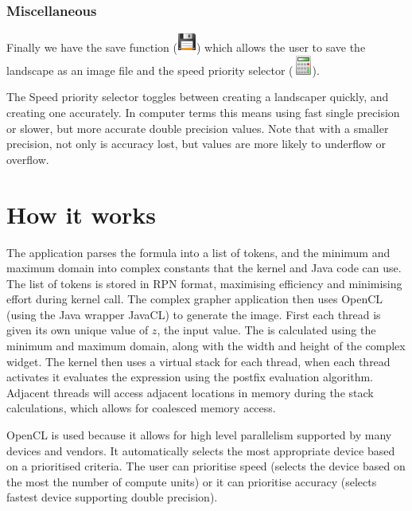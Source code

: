 \documentclass{article}
\begin{document}
			\subsubsection{Miscellaneous}
				Finally we have the save function (\includegraphics[height=\fontcharht\font`\B]{../src/resources/toolbar/save}) which allows the user to save the landscape as an image file and the speed priority selector (\includegraphics[height=\fontcharht\font`\B]{../src/resources/toolbar/calculator}).
				
				The Speed priority selector toggles between creating a landscaper quickly, and creating one accurately. In computer terms this means using fast single precision  or slower, but more accurate double precision values. Note that with a smaller precision, not only is accuracy lost, but values are more likely to underflow or overflow.
		
	\section{How it works}
		The application parses the formula into a list of tokens, and the minimum and maximum domain into complex constants that the kernel and Java code can use. The list of tokens is stored in RPN format, maximising efficiency and minimising effort during kernel call. The complex grapher application then uses OpenCL (using the Java wrapper JavaCL) to generate the image. First each thread is given its own unique value of $z$, the input value. The is calculated using the minimum and maximum domain, along with the width and height of the complex widget. The kernel then uses a virtual stack for each thread, when each thread activates it evaluates the expression using the postfix evaluation algorithm. Adjacent threads will access adjacent locations in memory during the stack calculations, which allows for coalesced memory access. 
		
		OpenCL is used because it allows for high level parallelism supported by many devices and vendors. It automatically selects the most appropriate device based on a prioritised criteria. The user can prioritise speed (selects the device based on the most the number of compute units) or it can prioritise accuracy (selects fastest device supporting double precision). 
		
\end{document}
